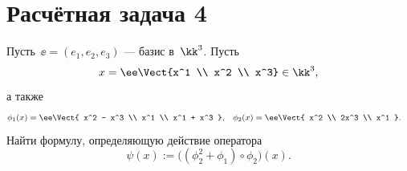 \section{Расчётная задача 4}
Пусть~$\ee = (e_1, e_2, e_3)$ --- базис в~$\kk^3$.
Пусть
\[
	x =
	\ee
	\Vect{x^1 \\ x^2 \\ x^3}
	\in \kk^3
	,
\]
а также
\begin{align*}
	\phi_1(x) &=
	\ee
	\Vect{
		x^2 - x^3 \\
		x^1 \\
		x^1 + x^3
	}
	,
	&
	\phi_2(x) &=
	\ee
	\Vect{
		x^2 \\
		2x^3 \\
		x^1
	}
	.
\end{align*}
Найти формулу, определяющую действие оператора
\[
	\psi(x) :=
	\bigl(
		(\phi_2^2 + \phi_1)
		\circ
		\phi_2
	\bigr)
	(x)
	.
\]

